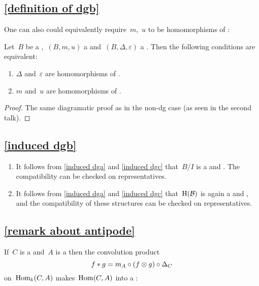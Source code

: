 \subsection{\cref{definition of dgb}}
\label{definition of dgb remark}

One can also could equivalently require~$m$,~$u$ to be homomorphisms of {\dgcs}:

\begin{lemma}
  \label{characterization of bialgebras}
  Let~$B$ be a {\dgv},~$(B, m, u)$ a {\dga} and~$(B, \Delta, \varepsilon)$ a {\dgc}.
  Then the following conditions are equivalent:
  \begin{enumerate}
    \item
      $\Delta$ and~$\varepsilon$ are homomorphisms of {\dgas}.
    \item
      $m$ and~$u$ are homomorphisms of {\dgcs}.
  \end{enumerate}
\end{lemma}

\begin{proof}
  The same diagramatic proof as in the non-dg case (as seen in the second talk).
\end{proof}





\subsection{\cref{induced dgb}}
\label{induced dgb proof}

\begin{enumerate}
  \item
    It follows from \cref{induced dga} and \cref{induced dgc} that~$B/I$ is a {\dga} and {\dgc}.
    The compatibility can be checked on representatives.
  \item
    It follows from \cref{induced dga} and \cref{induced dgc} that~$\operatorname{H}(\mathcal{B})$ is again a {\dga} and {\dgc}, and the compatibility of these structures can be checked on representatives.
\end{enumerate}





\subsection{\cref{remark about antipode}}
\label{remark about antipode proof}

If~$C$ is a {\dgc} and~$A$ is a {\dga} then the convolution product
\[
  f * g
  =
  m_A \circ (f \otimes g) \circ \Delta_C
\]
on~$\operatorname{Hom}_k(C,A)$ makes~$\operatorname{Hom}(C,A)$ into a {\dga}:

